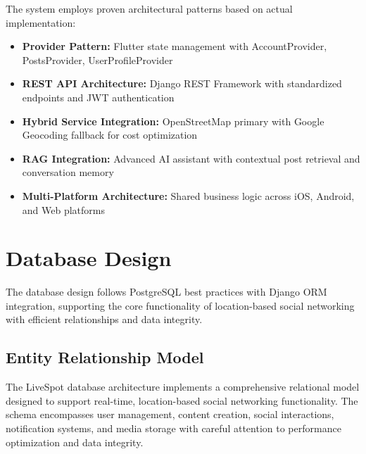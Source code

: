 The system employs proven architectural patterns based on actual implementation:
\begin{itemize}
    \item \textbf{Provider Pattern:} Flutter state management with AccountProvider, PostsProvider, UserProfileProvider
    \item \textbf{REST API Architecture:} Django REST Framework with standardized endpoints and JWT authentication
    \item \textbf{Hybrid Service Integration:} OpenStreetMap primary with Google Geocoding fallback for cost optimization
    \item \textbf{RAG Integration:} Advanced AI assistant with contextual post retrieval and conversation memory
    \item \textbf{Multi-Platform Architecture:} Shared business logic across iOS, Android, and Web platforms
\end{itemize}

\section{Database Design}
\label{sec:database_design}

The database design follows PostgreSQL best practices with Django ORM integration, supporting the core functionality of location-based social networking with efficient relationships and data integrity.

\subsection{Entity Relationship Model}

The LiveSpot database architecture implements a comprehensive relational model designed to support real-time, location-based social networking functionality. The schema encompasses user management, content creation, social interactions, notification systems, and media storage with careful attention to performance optimization and data integrity.

\clearpage


